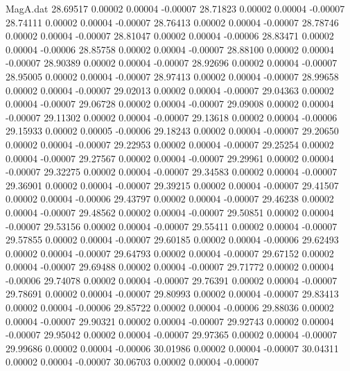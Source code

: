 \begin{filecontents}{MagA.dat}
  28.69517    0.00002    0.00004   -0.00007
  28.71823    0.00002    0.00004   -0.00007
  28.74111    0.00002    0.00004   -0.00007
  28.76413    0.00002    0.00004   -0.00007
  28.78746    0.00002    0.00004   -0.00007
  28.81047    0.00002    0.00004   -0.00006
  28.83471    0.00002    0.00004   -0.00006
  28.85758    0.00002    0.00004   -0.00007
  28.88100    0.00002    0.00004   -0.00007
  28.90389    0.00002    0.00004   -0.00007
  28.92696    0.00002    0.00004   -0.00007
  28.95005    0.00002    0.00004   -0.00007
  28.97413    0.00002    0.00004   -0.00007
  28.99658    0.00002    0.00004   -0.00007
  29.02013    0.00002    0.00004   -0.00007
  29.04363    0.00002    0.00004   -0.00007
  29.06728    0.00002    0.00004   -0.00007
  29.09008    0.00002    0.00004   -0.00007
  29.11302    0.00002    0.00004   -0.00007
  29.13618    0.00002    0.00004   -0.00006
  29.15933    0.00002    0.00005   -0.00006
  29.18243    0.00002    0.00004   -0.00007
  29.20650    0.00002    0.00004   -0.00007
  29.22953    0.00002    0.00004   -0.00007
  29.25254    0.00002    0.00004   -0.00007
  29.27567    0.00002    0.00004   -0.00007
  29.29961    0.00002    0.00004   -0.00007
  29.32275    0.00002    0.00004   -0.00007
  29.34583    0.00002    0.00004   -0.00007
  29.36901    0.00002    0.00004   -0.00007
  29.39215    0.00002    0.00004   -0.00007
  29.41507    0.00002    0.00004   -0.00006
  29.43797    0.00002    0.00004   -0.00007
  29.46238    0.00002    0.00004   -0.00007
  29.48562    0.00002    0.00004   -0.00007
  29.50851    0.00002    0.00004   -0.00007
  29.53156    0.00002    0.00004   -0.00007
  29.55411    0.00002    0.00004   -0.00007
  29.57855    0.00002    0.00004   -0.00007
  29.60185    0.00002    0.00004   -0.00006
  29.62493    0.00002    0.00004   -0.00007
  29.64793    0.00002    0.00004   -0.00007
  29.67152    0.00002    0.00004   -0.00007
  29.69488    0.00002    0.00004   -0.00007
  29.71772    0.00002    0.00004   -0.00006
  29.74078    0.00002    0.00004   -0.00007
  29.76391    0.00002    0.00004   -0.00007
  29.78691    0.00002    0.00004   -0.00007
  29.80993    0.00002    0.00004   -0.00007
  29.83413    0.00002    0.00004   -0.00006
  29.85722    0.00002    0.00004   -0.00006
  29.88036    0.00002    0.00004   -0.00007
  29.90321    0.00002    0.00004   -0.00007
  29.92743    0.00002    0.00004   -0.00007
  29.95042    0.00002    0.00004   -0.00007
  29.97365    0.00002    0.00004   -0.00007
  29.99686    0.00002    0.00004   -0.00006
  30.01986    0.00002    0.00004   -0.00007
  30.04311    0.00002    0.00004   -0.00007
  30.06703    0.00002    0.00004   -0.00007

\end{filecontents}
